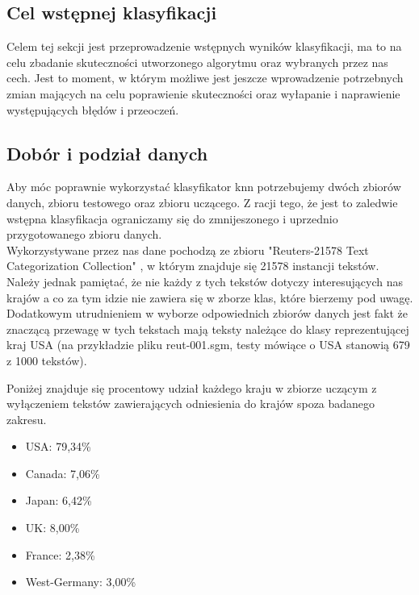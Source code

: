\documentclass{article}
\begin{document}
\subsection*{Cel wstępnej klasyfikacji}

Celem tej sekcji jest przeprowadzenie wstępnych wyników klasyfikacji, ma to na celu zbadanie skuteczności utworzonego algorytmu oraz wybranych przez nas cech. Jest to moment, w którym możliwe jest jeszcze wprowadzenie potrzebnych zmian mających na celu poprawienie skuteczności oraz wyłapanie i naprawienie występujących błędów i przeoczeń.

\subsection*{Dobór i podział danych}

Aby móc poprawnie wykorzystać klasyfikator knn potrzebujemy dwóch zbiorów danych, zbioru testowego oraz zbioru uczącego. Z racji tego, że jest to zaledwie wstępna klasyfikacja ograniczamy się do zmnijeszonego i uprzednio przygotowanego zbioru danych. \\

\noindent Wykorzystywane przez nas dane pochodzą ze zbioru "Reuters-21578 Text Categorization Collection" , w którym znajduje się 21578 instancji tekstów. Należy jednak pamiętać, że nie każdy z tych tekstów dotyczy interesujących nas krajów a co za tym idzie nie zawiera się w zborze klas, które bierzemy pod uwagę. Dodatkowym utrudnieniem w wyborze odpowiednich zbiorów danych jest fakt że znaczącą przewagę w tych tekstach mają teksty należące do klasy reprezentującej kraj USA (na przykładzie pliku reut-001.sgm, testy mówiące o USA stanowią 679 z 1000 tekstów). \\

\newpage

\noindent Poniżej znajduje się procentowy udział każdego kraju w zbiorze uczącym z wyłączeniem tekstów zawierających odniesienia do krajów spoza badanego zakresu.

\begin{itemize}
    \item USA: 79,34\%
    \item Canada: 7,06\%
    \item Japan: 6,42\%
    \item UK: 8,00\%
    \item France: 2,38\%
    \item West-Germany: 3,00\%
\end{itemize}
\end{document}
